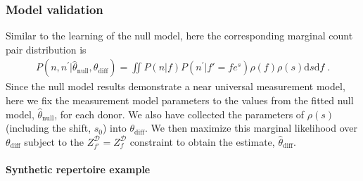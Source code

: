 \documentclass[letterpaper,english,prl,reprint,longbibliography]{revtex4-1} %
\begin{document}
\subsubsection*{Model validation}

Similar to the learning of the null model, here the corresponding marginal count pair distribution is 
\begin{equation}
    \begin{split}
	P(n,n^{\prime}|\hat{\theta}_{\textrm{null}},\theta_{\textrm{diff}})=\iint P(n|f)P(n^{\prime}|f'=fe^s)\rho(f)\rho(s)\text{d}s\text{d}f\;.
	\end{split}
\end{equation}
Since the null model results demonstrate a near universal measurement model, here we fix the measurement model parameters to the values from the fitted null model, $\hat{\theta}_{\textrm{null}}$, for each donor. We also have collected the parameters of $\rho(s)$ (including the shift, $s_0$) into $\theta_{\textrm{diff}}$. 
We then maximize this marginal likelihood over $\theta_{\textrm{diff}}$ subject to the $Z^\mathcal{D}_{f'}=Z^\mathcal{D}_f$ constraint to obtain the estimate, $\hat{\theta}_{\textrm{diff}}$. 





\paragraph{Synthetic repertoire example}
\end{document}
